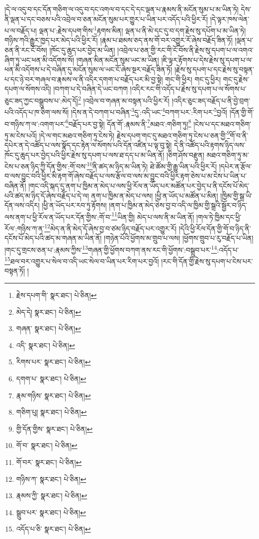 །དེ་ལ་འདུ་བ་དང་དོན་གཅིག་ལ་འདུ་བ་དང་འགལ་བ་དང་དེ་དང་ལྡན་པ་རྣམས་ནི་མངོན་སུམ་པ་མ་ཡིན་ཏེ། དེས་ནི་ལྡན་པ་དང་བཅས་པའི་འབྲེལ་བ་ཅན་མངོན་སུམ་པར་གྱུར་པ་ཡིན་པར་འདོད་པའི་ཕྱིར་རོ། །དེ་ལྟར་ཁས་ལེན་པ་ལ་བརྗོད་པ། ལྡན་པ་:རྗེས་དཔག་གིས་\footnote{རྗེས་དཔག་གི་  སྣར་ཐང་།  པེ་ཅིན། }རྟགས་མིན། ལྡན་པ་ནི་མེ་དང་དུ་བ་དག་རྗེས་སུ་དཔོག་པ་མ་ཡིན་ཏེ། གཉིས་ཀའི་རྒྱུར་ཁྱད་པར་མེད་པའི་ཕྱིར་རོ། །རྣམ་པ་ཐམས་ཅད་ནས་གོ་བར་འགྱུར་རོ་ཞེས་བརྗོད་ཟིན་ཏོ། །ལྡན་པ་ཅན་ནི་རང་ངོ་བོས། །ཁོང་དུ་ཆུད་པར་བྱེད་མ་ཡིན། །འབྲེལ་པ་ཅན་གྱི་རང་གི་ངོ་བོས་ནི་རྗེས་སུ་དཔག་པ་ལ་འགའ་ཞིག་ཏུ་ཡང་ཕན་མི་འདོགས་སོ། །གཞན་མིན་མངོན་སུམ་ཡང་མ་ཡིན། །ཇི་ལྟར་རྟོགས་པ་དེས་རྗེས་སུ་དཔག་པ་ལ་ཕན་མི་འདོགས་པ་དེ་བཞིན་དུ་མངོན་སུམ་ལ་ཡང་ངོ་ཞེས་སྔར་བརྗོད་ཟིན་ཏོ། །རྗེས་སུ་དཔག་པ་དང་རྗེས་སུ་བསྟན་པ་དང་ཉེ་བར་གཞལ་བ་རྣམས་ལ་ནི་འདིར་དགག་པ་བརྗོད་པར་མི་བྱ་སྟེ། གང་གི་ཕྱིར། གང་དུ་ཕྱིར། གང་དུ་རྗེས་དཔག་ལ་སོགས་འདི། །བཀག་པ་དེ་བཞིན་དེ་ཡང་བཀག །འདིར་རང་གི་འདོད་པ་རྗེས་སུ་དཔག་པ་ལ་སོགས་པ་ཅུང་ཟད་ཀྱང་བསྒྲུབས་པ་:མེད་དོ།\footnote{མེད་དེ།  སྣར་ཐང་།  པེ་ཅིན། } །འབྲེལ་བ་གཞན་མ་བསྟན་པའི་ཕྱིར་རོ། །འདིར་ཅུང་ཟད་བརྗོད་པ་ནི་བྱེ་བྲག་པའི་འདོད་པ་ཁ་ཅིག་ལས་སོ། །དེས་ན་དེ་བཀག་པ་བཞིན་\footnote{གཞན་  སྣར་ཐང་།  པེ་ཅིན། }དུ་:འདི་ཡང་\footnote{འདི་  སྣར་ཐང་།  པེ་ཅིན། }བཀག་པར་:རིག་པར་\footnote{རིགས་པར་  སྣར་ཐང་།  པེ་ཅིན། }བྱའོ། །དོན་གྱི་གོ་བ་གཉིས་ཀ་ལ་:འགག་པར་\footnote{དགག་པ་  སྣར་ཐང་།  པེ་ཅིན། }བརྗོད་པར་བྱ་སྟེ། དོན་གོ་:རྣམས་ནི་\footnote{རྣམ་གཉིས་  སྣར་ཐང་།  པེ་ཅིན། }མཐའ་:གཅིག་ཏུ།\footnote{གཅིག་པུ།  སྣར་ཐང་།  པེ་ཅིན། } །ངེས་པ་དང་མཐའ་གཅིག་ཏུ་མ་ངེས་པའོ། །དེ་ལ་གང་མཐའ་གཅིག་ཏུ་ངེས་ཏེ། རྗེས་དཔག་གང་དུ་མཐའ་གཅིག་ཏུ་ངེས་པ་ཅན་གྱི་\footnote{གྱི་དོན་གྱིས་  སྣར་ཐང་།  པེ་ཅིན། }གོ་བ་ནི་དཔེར་ན་དེ་འཚོད་པ་ལས་སྣོད་དང་རྟེན་ལ་སོགས་པའི་དོན་འཛིན་པ་ལྟ་བུ་སྟེ། དེ་ནི་འཚོད་པའི་རྟགས་ཉིད་ལས་ཁོང་དུ་ཆུད་པར་བྱེད་པའི་ཕྱིར་རྗེས་སུ་དཔག་པ་ལས་ཐ་དད་པ་མ་ཡིན་ནོ། །ཅིག་ཤོས་བརྫུན། མཐའ་གཅིག་ཏུ་མ་ངེས་པ་ཅན་ཉིད་ཀྱི་དོན་གྱིས་:གོ་བས་\footnote{གོ་བ་  སྣར་ཐང་།  པེ་ཅིན། }ནི་ཚད་མ་ཉིད་མ་ཡིན་ཏེ། ཐེ་ཚོམ་གྱི་རྒྱུ་ཡིན་པའི་ཕྱིར་རོ། །དཔེར་ན་རྩོལ་བ་ལས་བྱུང་བའི་ཕྱིར་མི་རྟག་གོ་ཞེས་བརྗོད་པ་ལས་རྩོལ་བ་ལས་མ་བྱུང་བའི་ཕྱིར་རྟག་ཅེས་པ་མ་ངེས་པ་ཡིན་པ་བཞིན་ནོ། །གང་འདི་སྐད་དུ་ནག་པ་ཁྱིམ་ན་མེད་པ་ལས་ཕྱི་རོལ་ན་ཡོད་པར་མཚོན་པར་བྱེད་པ་ནི་དངོས་པོ་མེད་པའི་ཚད་མ་ཉིད་དོ་ཞེས་བརྗོད་པ་དེ་ལ། ནག་པ་ཁྱིམ་ན་མེད་པ་ལས། །ཕྱི་ན་ཡོད་པ་མཚོན་པ་མིན། །ཁྱིམ་གྱི་སྒྲ་ཡི་དོན་ལས་འདིར། །ཕྱི་ན་ཡོད་པར་རབ་ཏུ་རྟོགས། །ནག་པ་ཁྱིམ་ན་མེད་ཅེས་བྱ་བ་འདི་ལ་ཁྱིམ་གྱི་སྒྲའི་སྦྱོར་བ་ཉིད་ལས་ནག་པ་ཕྱི་རོལ་ན་ཡོད་པར་དོན་གྱིས་:གོ་བ་\footnote{གོ་བར་  སྣར་ཐང་།  པེ་ཅིན། }ཡིན་གྱི། མེད་པ་ལས་ནི་མ་ཡིན་ནོ། །གལ་ཏེ་ཁྱིམ་དང་ཕྱི་རོལ་:གཉིས་ཀ་ན་\footnote{གཉིས་ཀ་  སྣར་ཐང་།  པེ་ཅིན། }མེད་ན་ནི་མེད་དོ་ཞེས་བྱ་བ་ཙམ་ཉིད་བརྗོད་པར་འགྱུར་རོ། །དེའི་ཕྱི་རོལ་དོན་གྱི་གོ་བ་ཉིད་ནི་དངོས་པོ་མེད་པའི་ཚད་མ་གཞན་མ་ཡིན་ནོ། །གཉེན་པོའི་ཕྱོགས་མ་གྲུབ་པ་ལས། །ཕྱོགས་གྲུབ་པ་རུ་བརྗོད་པ་ཡིན། །གང་དུ་གྲངས་ཅན་པ་:རྣམས་ཀྱིས་\footnote{རྣམས་ཀྱི་  སྣར་ཐང་།  པེ་ཅིན། }གཞན་གྱི་ཕྱོགས་བཀག་ནས་རང་གི་ཕྱོགས་:བསྒྲུབ་པར་\footnote{སྒྲུབ་པར་  སྣར་ཐང་།  པེ་ཅིན། }:འདོད་པ་\footnote{འདོད་པ་ཅི་  སྣར་ཐང་།  པེ་ཅིན། }ཐལ་བར་འགྱུར་པ་སེལ་བ་འདི་ཡང་སེལ་བ་ཡིན་པར་རིག་པར་བྱའོ། །རང་གི་དོན་གྱི་རྗེས་སུ་དཔག་པ་ངེས་པར་བསྟན་ཏོ། །
